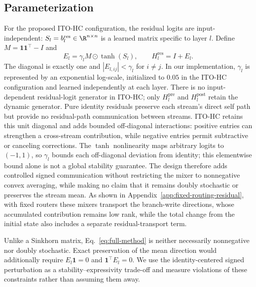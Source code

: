 \documentclass{article}
\newcommand{\Hpre}{H^{\mathrm{pre}}}
\newcommand{\Hpost}{H^{\mathrm{post}}}
\newcommand{\Hres}{H^{\mathrm{res}}}
\begin{document}
\subsection{Parameterization}
For the proposed ITO-HC configuration, the residual logits are input-independent:
$S_l=b_l^{\mathrm{res}}\in\R^{n\times n}$ is a learned matrix specific to
layer $l$. Define $M=\mathbf 1\mathbf 1^\top-I$ and
\begin{equation}
 E_l=\gamma_l M\odot\tanh(S_l),\qquad \Hres_l=I+E_l.
 \label{eq:full-method}
\end{equation}
The diagonal is exactly one and $|E_{l,ij}|<\gamma_l$ for $i\ne j$. In our
implementation, $\gamma_l$ is represented by an exponential log-scale,
initialized to $0.05$ in the ITO-HC configuration and learned independently at
each layer. There is no input-dependent residual-logit generator in ITO-HC;
only $\Hpre_l$ and $\Hpost_l$ retain the dynamic generator.
Pure identity residuals preserve each stream's direct self path but provide no residual-path communication between streams. ITO-HC retains this unit diagonal and adds bounded off-diagonal interactions: positive entries can strengthen a cross-stream contribution, while negative entries permit subtractive or canceling corrections. The $\tanh$ nonlinearity maps arbitrary logits to $(-1,1)$, so $\gamma_l$ bounds each off-diagonal deviation from identity; this elementwise bound alone is not a global stability guarantee. The design therefore adds controlled signed communication without restricting the mixer to nonnegative convex averaging, while making no claim that it remains doubly stochastic or preserves the stream mean. As shown in Appendix~\ref{app:fixed-routing-residual}, with fixed routers these mixers transport the branch-write directions, whose accumulated contribution remains low rank, while the total change from the initial state also includes a separate residual-transport term.

Unlike a Sinkhorn matrix, Eq.~\ref{eq:full-method} is neither necessarily nonnegative nor doubly stochastic. Exact preservation of the mean direction would additionally require $E_l\mathbf 1=0$ and $\mathbf 1^\top E_l=0$. We use the identity-centered signed perturbation as a stability--expressivity trade-off and measure violations of these constraints rather than assuming them away.
\end{document}
